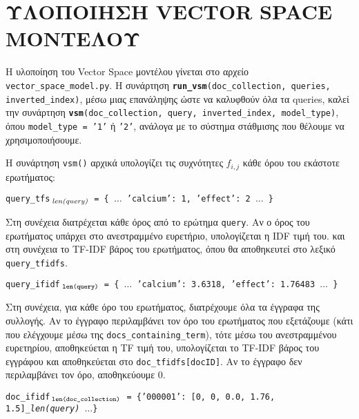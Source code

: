 ﻿\documentclass[12pt]{report}
\begin{document}
    \section{ΥΛΟΠΟΙΗΣΗ VECTOR SPACE ΜΟΝΤΕΛΟΥ}

    Η υλοποίηση του Vector Space μοντέλου γίνεται στο αρχείο \verb|vector_space_model.py|.
    Η συνάρτηση \texttt{\textbf{run\_vsm}(doc\_collection, queries, inverted\_index)}, μέσω μιας επανάληψης ώστε να καλυφθούν όλα τα queries,
    καλεί την συνάρτηση \texttt{\textbf{vsm}(doc\_collection, query, inverted\_index, model\_type)}, όπου \texttt{model\_type = '1'} ή \texttt{'2'}, ανάλογα με το σύστημα στάθμισης που θέλουμε να χρησιμοποιήσουμε.

    H συνάρτηση \texttt{vsm()} αρχικά υπολογίζει τις συχνότητες \(f_{i,j}\) κάθε όρου του εκάστοτε ερωτήματος:
    \begin{graycomment}
        \texttt{query\_tfs\(_{\textit{\hspace{2pt}len(query)}}\)\ = \{ \(\ldots\) 'calcium': 1, 'effect': 2 \(\ldots\) \}}
    \end{graycomment}

    Στη συνέχεια διατρέχεται κάθε όρος από το ερώτημα \texttt{query}. Αν ο όρος του ερωτήματος υπάρχει στο ανεστραμμένο ευρετήριο, υπολογίζεται η IDF τιμή του.
    και στη συνέχεια το TF-IDF βάρος του ερωτήματος, όπου θα αποθηκευτεί στο λεξικό \verb|query_tfidfs|.

    \begin{graycomment}
        \texttt{\small query\_ifidf\(_{\textit{\tt\hspace{2pt}len(query)}}\)\ = \{ \(\ldots\) 'calcium': 3.6318, 'effect': 1.76483 \(\ldots\) \}}
    \end{graycomment}

    Στη συνέχεια, για κάθε όρο του ερωτήματος, διατρέχουμε όλα τα έγγραφα της συλλογής. Αν το έγγραφο περιλαμβάνει τον όρο του ερωτήματος που εξετάζουμε
    (κάτι που ελέγχουμε μέσω της \verb|docs_containing_term|), τότε μέσω του ανεστραμμένου ευρετηρίου, αποθηκεύεται η TF τιμή του, υπολογίζεται
    το TF-IDF βάρος του εγγράφου και αποθηκεύεται στο \verb|doc_tfidfs[docID]|. Αν το έγγραφο δεν περιλαμβάνει τον όρο, αποθηκεύουμε 0.

    \begin{graycomment}
        \texttt{\small doc\_ifidf\(_{\textit{\tt\hspace{2pt}len(doc\_collection)}}\)\ = \{'000001': [0, 0, 0.0, 1.76, 1.5]_{\textit{\tt len(query)}} \(\ldots\)\}}
    \end{graycomment}
\end{document}
